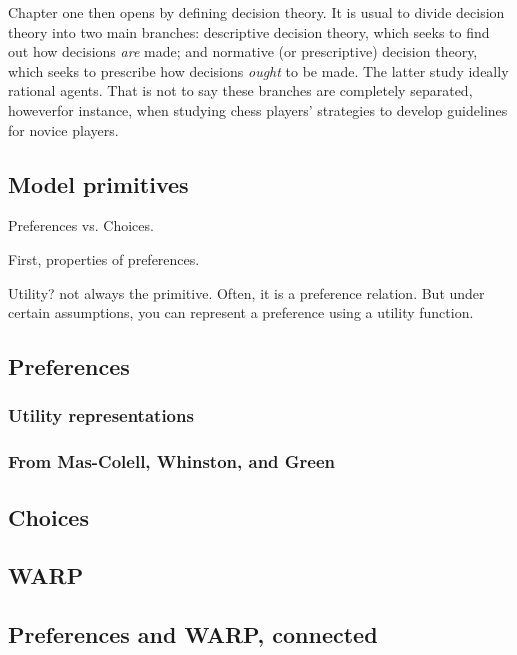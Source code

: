 \documentclass[letterpaper, 12pt, titlepage]{article}
\begin{document}
Chapter one then opens by defining decision theory. It is usual to divide
decision theory into two main branches: descriptive decision theory, which seeks
to find out how decisions \emph{are} made; and normative (or prescriptive)
decision theory, which seeks to prescribe how decisions \emph{ought} to be
made. The latter study ideally rational agents. That is not to say these
branches are completely separated, however\textemdash for instance, when
studying chess players' strategies to develop guidelines for novice players. 

\subsection{Model primitives}
\label{subsec:primitives}

Preferences vs. Choices.

First, properties of preferences.

Utility? not always the primitive. Often, it is a preference relation.  But
under certain assumptions, you can represent a preference using a utility
function.

\subsection{Preferences}
\label{subsec:preferences}

\subsubsection{Utility representations}
\label{subsubsec:utility-representations}

\subsubsection{From Mas-Colell, Whinston, and Green}
\label{subsubsec:preference-utility}

\subsection{Choices}
\label{subsec:choices}

\subsection{WARP}
\label{subsec:warp}

\subsection{Preferences and WARP, connected}
\label{subsec:preferences-and-warp}
\end{document}
